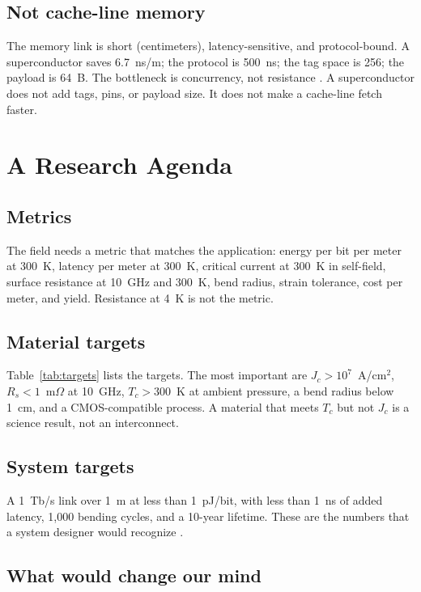 \documentclass[10pt,letterpaper]{article}
\begin{document}
\subsection{Not cache-line memory}

The memory link is short (centimeters), latency-sensitive, and protocol-bound. A superconductor saves 6.7~ns/m; the protocol is 500~ns; the tag space is 256; the payload is 64~B. The bottleneck is concurrency, not resistance \cite{pcie6,cxl}. A superconductor does not add tags, pins, or payload size. It does not make a cache-line fetch faster.

\section{A Research Agenda}
\label{sec:agenda}

\subsection{Metrics}

The field needs a metric that matches the application: energy per bit per meter at 300~K, latency per meter at 300~K, critical current at 300~K in self-field, surface resistance at 10~GHz and 300~K, bend radius, strain tolerance, cost per meter, and yield. Resistance at 4~K is not the metric.

\subsection{Material targets}

Table~\ref{tab:targets} lists the targets. The most important are $J_c > 10^7$~A/cm$^2$, $R_s < 1$~m$\Omega$ at 10~GHz, $T_c > 300$~K at ambient pressure, a bend radius below 1~cm, and a CMOS-compatible process. A material that meets $T_c$ but not $J_c$ is a science result, not an interconnect.

\subsection{System targets}

A 1~Tb/s link over 1~m at less than 1~pJ/bit, with less than 1~ns of added latency, 1,000 bending cycles, and a 10-year lifetime. These are the numbers that a system designer would recognize \cite{irds}.

\subsection{What would change our mind}
\end{document}
